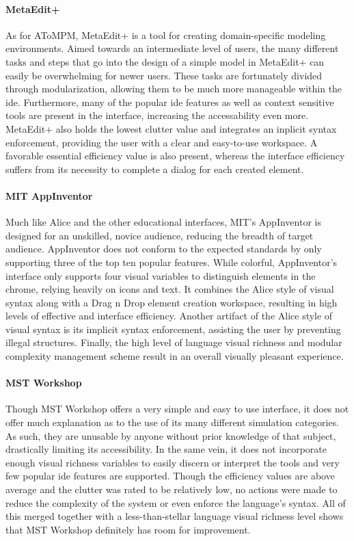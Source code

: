 \paragraph{MetaEdit+} As for AToMPM, MetaEdit+ is a tool for creating
domain-specific modeling environments. Aimed towards an intermediate level
of users, the many different tasks and steps that go into the design of a
simple model in MetaEdit+ can easily be overwhelming for newer users.
These tasks are fortunately divided through modularization, allowing them
to be much more manageable within the \ac{ide}. Furthermore, many of the
popular \ac{ide} features as well as context sensitive tools are present in
the interface, increasing the accessability even more. MetaEdit+ also holds
the lowest clutter value and integrates an inplicit syntax enforcement,
providing the user with a clear and easy-to-use workspace. A favorable
essential efficiency value is also present, whereas the interface
efficiency suffers from its necessity to complete a dialog for each created
element.

\paragraph{MIT AppInventor} Much like Alice and the other educational
interfaces, MIT's AppInventor is designed for an unskilled, novice
audience, reducing the breadth of target audience. AppInventor does not
conform to the expected standards by only supporting three of the top ten
popular features. While colorful, AppInventor's interface only supports
four visual variables to distinguish elements in the chrome, relying
heavily on icons and text. It combines the Alice style of visual syntax
along with a Drag n Drop element creation workspace, resulting in high
levels of effective and interface efficiency. Another artifact of the Alice
style of visual syntax is its implicit syntax enforcement, assisting the
user by preventing illegal structures. Finally, the high level of language
visual richness and modular complexity management scheme result in an
overall visually pleasant experience.

\paragraph{MST Workshop} Though MST Workshop offers a very simple and easy
to use interface, it does not offer much explanation as to the use of its
many different simulation categories. As such, they are unusable by anyone
without prior knowledge of that subject, drastically limiting its
accessibility. In the same vein, it does not incorporate enough visual
richness variables to easily discern or interpret the tools and very few
popular \ac{ide} features are supported. Though the efficiency values are
above average and the clutter was rated to be relatively low, no actions
were made to reduce the complexity of the system or even enforce the
language's syntax. All of this merged together with a less-than-stellar
language visual richness level shows that MST Workshop definitely has room
for improvement.

